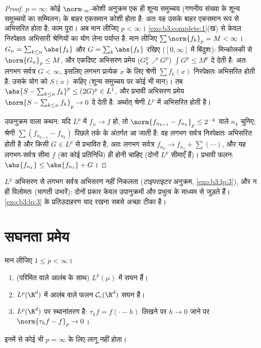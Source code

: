 \begin{proof}
$p = \infty$: कोई $\norm\cdot_\infty$-कोशी अनुक्रम एक ही शून्य समुच्चय (गणनीय संख्या के
शून्य समुच्चयों का सम्मिलन) के बाहर एकसमान कोशी होता है: अतः वह
उसके बाहर एकसमान रूप से अभिसरित होता है; काम पूरा। अब मान लीजिए
$p < \infty$। \cref{exo:b3:complete:1}(ख) से केवल निरपेक्षतः अभिसारी श्रेणियों का योग लेना
पर्याप्त है: मान लीजिए $\sum\norm{f_k}_p = M < \infty$। $G_n = \sum_{k \leq n}\abs{f_k}$ और $G = \sum_k\abs{f_k}$ रखिए ($[0,\infty]$ में
बिंदुशः): मिन्कोव्स्की से $\norm{G_n}_p \leq
M$, और एकदिष्ट अभिसरण प्रमेय ($G_n^p \nearrow G^p$)
$\int G^p \leq M^p$ दे देती है: अतः लगभग सर्वत्र $G < \infty$, इसलिए लगभग प्रत्येक $x$
के लिए श्रेणी $\sum f_k(x)$ निरपेक्षतः अभिसरित होती है; उसके योग को $S(x)$
कहिए (शून्य समुच्चय पर कोई भी मान)। तब $\abs{S - \sum_{k\leq n}f_k}^p \leq (2G)^p
\in L^1$, और प्रभावी अभिसरण
प्रमेय $\norm{S - \sum_{k\leq n}f_k}_p \to 0$ दे देती है: अर्थात् श्रेणी $L^p$ में अभिसरित होती है।

उपानुक्रम वाला कथन: यदि $L^p$ में $f_n \to f$ हो, तो $\norm{f_{n_{k+1}} - f_{n_k}}_p \leq 2^{-k}$ वाले $n_k$
चुनिए; श्रेणी $\sum(f_{n_{k+1}} - f_{n_k})$ पिछले तर्क के अंतर्गत आ जाती है: वह लगभग सर्वत्र
निरपेक्षतः अभिसरित होती है और किसी $G \in
L^p$ से प्रभावित है, अतः लगभग
सर्वत्र $f_{n_k} \to f_{n_1} + \sum(\cdots)$, और यह लगभग-सर्वत्र सीमा $f$ (का कोई प्रतिनिधि) ही
होनी चाहिए (दोनों $L^p$ सीमाएँ हैं)। प्रभावी फलन: $\abs{f_{n_k}} \leq \abs{f_{n_1}} + G$।
\end{proof}

\begin{remark}\label{rem:b3:lp:modes}
$L^p$ अभिसरण से लगभग सर्वत्र अभिसरण नहीं निकलता (\emph{टाइपराइटर}
अनुक्रम, \cref{exo:b3:lp:3}), और न ही विलोमतः (भागती उभारें): दोनों प्रकार केवल
उपानुक्रमों और प्रभुत्व के माध्यम से जुड़ते हैं। \cref{exo:b3:lp:3} के
प्रतिउदाहरण याद रखना सबसे अच्छा टीका है।
\end{remark}

\section{सघनता प्रमेय}

\begin{theorem}\label{thm:b3:lp:density}
मान लीजिए $1 \leq p < \infty$।
\begin{enumerate}
  \item {} (परिमित  वाले आलंब के साथ) $L^p(\mu)$ में सघन हैं।
  \item $L^p(\R^d)$ में  आलंब वाले  फलन $\mathcal C_c(\R^d)$ सघन हैं।
  \item $L^p(\R^d)$ पर स्थानांतरण  है: $\tau_hf = f(\cdot - h)$ लिखने पर $h \to 0$ जाने पर
        $\norm{\tau_hf - f}_p \to 0$।
\end{enumerate}
इनमें से कोई भी $p = \infty$ के लिए लागू नहीं होता।
\end{theorem}


